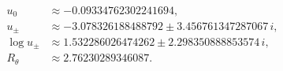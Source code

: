\[
\begin{aligned}
u_0 &\approx -0.09334762302241694,
\\
u_\pm &\approx -3.078326188488792 \pm 3.456761347287067\,i,
\\
\log u_\pm &\approx 1.532286026474262 \pm 2.298350888853574\,i,
\\
R_\theta &\approx 2.76230289346087.
\end{aligned}
\]
